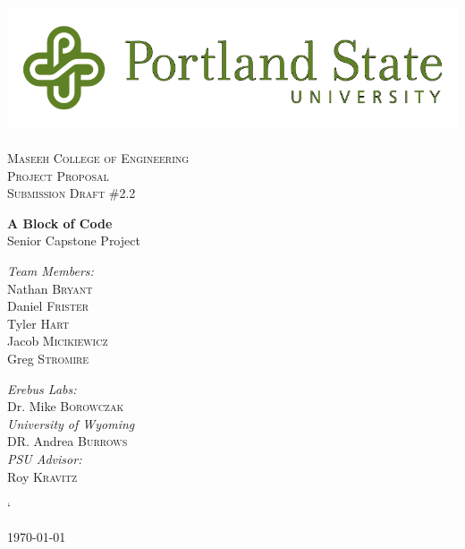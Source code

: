 
\linespread{1.1}
 
\begin{titlepage} 
\begin{center} 
 
\includegraphics[width=.75\textwidth]{./PSU_logo.png}~\\[.5cm] 
 
\textsc{\LARGE \color{PSU} Maseeh College of Engineering}\\[1.5cm] 
 
\textsc{\Large Project Proposal}\\[0.5cm]
\textsc{\Large Submission Draft \#2.2}\\[0.5cm]
\vspace{1cm} 
 
{ \huge \bfseries\color{PSU} A Block of Code\\[0.4cm] } 
  \large Senior Capstone Project
 
\vspace{2.5cm} 
 \begin{multicols}{2}
    
\begin{flushleft}
\noindent 
 \large 
\emph{\color{PSU}Team Members:}\\ 
Nathan \textsc{Bryant}\\ 
Daniel \textsc{Frister}\\
Tyler  \textsc{Hart}\\
Jacob   \textsc{Micikiewicz}\\
Greg    \textsc{Stromire}\\
\end{flushleft} 

 \begin{flushleft}
  \large 
 \emph{\color{PSU}Erebus Labs:} \\ 
 Dr. Mike  \textsc{Borowczak}\\ 
 \emph{\color{PSU}University of Wyoming}\\
 DR. Andrea \textsc{Burrows}\\ 
 \emph{\color{PSU}PSU Advisor:}\\ 
 Roy \textsc{Kravitz} 
 \end{flushleft}


 \end{multicols}` 
\vfill 
 
{\large \today} 
 
\end{center} 
\end{titlepage} 
 \tableofcontents

